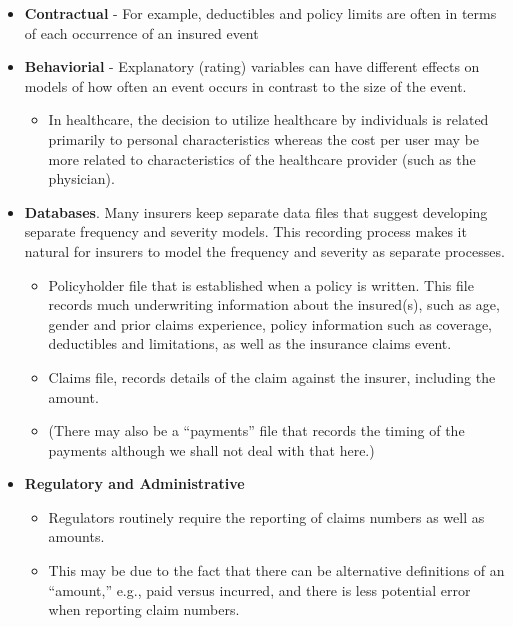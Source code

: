 \documentclass[]{book}
\providecommand{\tightlist}{%
  \setlength{\itemsep}{0pt}\setlength{\parskip}{0pt}}
\theoremstyle{definition}
\theoremstyle{definition}
\theoremstyle{definition}
\theoremstyle{remark}
\begin{document}
\begin{itemize}
\item
  \textbf{Contractual} - For example, deductibles and policy limits are
  often in terms of each occurrence of an insured event
\item
  \textbf{Behaviorial} - Explanatory (rating) variables can have
  different effects on models of how often an event occurs in contrast
  to the size of the event.

  \begin{itemize}
  \tightlist
  \item
    In healthcare, the decision to utilize healthcare by individuals is
    related primarily to personal characteristics whereas the cost per
    user may be more related to characteristics of the healthcare
    provider (such as the physician).
  \end{itemize}
\item
  \textbf{Databases}. Many insurers keep separate data files that
  suggest developing separate frequency and severity models. This
  recording process makes it natural for insurers to model the frequency
  and severity as separate processes.

  \begin{itemize}
  \item
    Policyholder file that is established when a policy is written. This
    file records much underwriting information about the insured(s),
    such as age, gender and prior claims experience, policy information
    such as coverage, deductibles and limitations, as well as the
    insurance claims event.
  \item
    Claims file, records details of the claim against the insurer,
    including the amount.
  \item
    (There may also be a ``payments'' file that records the timing of
    the payments although we shall not deal with that here.)
  \end{itemize}
\item
  \textbf{Regulatory and Administrative}

  \begin{itemize}
  \item
    Regulators routinely require the reporting of claims numbers as well
    as amounts.
  \item
    This may be due to the fact that there can be alternative
    definitions of an ``amount,'' e.g., paid versus incurred, and there
    is less potential error when reporting claim numbers.
  \end{itemize}
\end{itemize}
\end{document}
